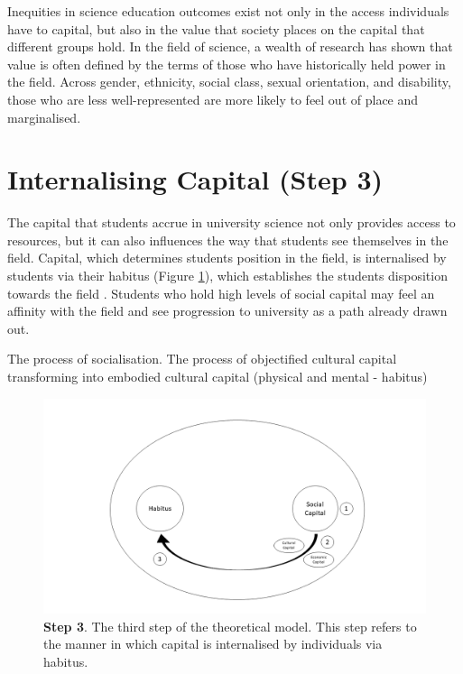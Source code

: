 Inequities in science education outcomes exist not only in the access individuals have to capital, but also in the value that society places on the capital that different groups hold. In the field of science, a wealth of research has shown that value is often defined by the terms of those who have historically held power in the field. Across gender, ethnicity, social class, sexual orientation, and disability, those who are less well-represented are more likely to feel out of place and marginalised. 


\section{Internalising Capital (Step 3)}
The capital that students accrue in university science not only provides access to resources, but it can also influences the way that students see themselves in the field. Capital, which determines students position in the field, is internalised by students via their habitus  (Figure \ref{fig:TheoreticalModel3_C5}), which establishes the students disposition towards the field \cite{Bourdieu1992}. Students who hold high levels of social capital may feel an affinity with the field and see progression to university as a path already drawn out.

The process of socialisation.
The process of objectified cultural capital transforming into embodied cultural capital (physical and mental - habitus)

\begin{figure}[ht]
\centering
\includegraphics[width=\textwidth]{C5 - Understanding Capital Accumulation/HabitusSocCap_TheoreticalModel3.png}
\caption{\label{fig:TheoreticalModel3_C5}\textbf{Step 3}. The third step of the theoretical model. This step refers to the manner in which capital is internalised by individuals via habitus.}
\end{figure}



